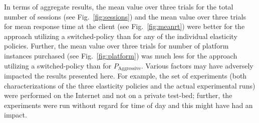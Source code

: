 In terms of aggregate results, the mean value over three trials for the total number of sessions (see Fig.~\ref{fig:sessions}) and the mean value over three trials for mean response time at the client (see Fig.~\ref{fig:meanrt}) were better for the  approach utilizing a  switched-policy than for any of the individual elasticity policies.  Further, the mean value over three trials for number of platform instances purchased (see Fig.~\ref{fig:platform}) was much less for the approach utilizing a  switched-policy than for $P_\text{Aggressive}$.
Various factors may have adversely impacted the results presented here.  For example, the set of experiments (both characterizations of the three elasticity policies and the actual experimental runs) were performed on the Internet and not on a private test-bed; further, the experiments were run without regard for time of day and this might have had an impact.

 

